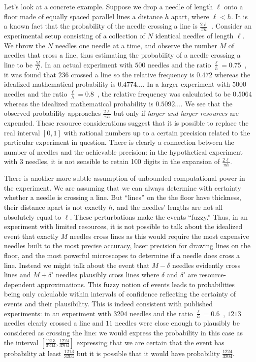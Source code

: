 \documentclass{article}
\theoremstyle{remark}
\begin{document}
Let's look at a concrete example. Suppose we drop a needle of length
$\ell$ onto a floor made of equally spaced parallel lines a distance
$h$ apart, where $\ell<h$. It is a known fact that the probability of
the needle crossing a line is
$\frac{2\ell}{\pi
  h}$~\cite{Buffon1777,DeMorgan1872,Hall1873,Uspensky1937}.
Consider an experimental setup consisting of a collection of $N$
identical needles of length $\ell$. We throw the $N$ needles one
needle at a time, and observe the number $M$ of needles that cross a
line, thus estimating the probability of a needle crossing a line to
be $\frac{M}{N}$. In an actual experiment with $500$ needles and the
ratio $\frac{\ell}{h}=0.75$~\cite{Hall1873}, it was found that $236$
crossed a line so the relative frequency is $0.472$ whereas the
idealized mathematical probability is $0.4774\ldots$.  In a larger
experiment with $5000$ needles and the ratio
$\frac{\ell}{h}=0.8$~\cite{Uspensky1937}, the relative frequency was
calculated to be $0.5064$ whereas the idealized mathematical
probability is $0.5092\ldots$. We see that the observed probability
approaches $\frac{2\ell}{\pi h}$ but only if \emph{larger and larger
  resources} are expended. These resource considerations suggest that
it is possible to replace the real interval $[0,1]$ with rational
numbers up to a certain precision related to the particular experiment
in question. There is clearly a connection between the number of
needles and the achievable precision: in the hypothetical experiment
with 3 needles, it is not sensible to retain 100 digits in the
expansion of $\frac{2\ell}{\pi h}$.

There is another more subtle assumption of unbounded computational
power in the experiment. We are assuming that we can always determine
with certainty whether a needle is crossing a line. But ``lines'' on
the the floor have thickness, their distance apart is not exactly $h$,
and the needles' lengths are not all absolutely equal to $\ell$.
These perturbations make the events ``fuzzy.'' Thus, in an experiment
with limited resources, it is not possible to talk about the idealized
event that exactly $M$ needles cross lines as this would require the
most expensive needles built to the most precise accuracy, laser
precision for drawing lines on the floor, and the most powerful
microscopes to determine if a needle does cross a line. Instead we
might talk about the event that $M-\delta$ needles evidently cross
lines and $M+\delta'$ needles plausibly cross lines where $\delta$ and
$\delta'$ are resource-dependent approximations. This fuzzy notion of
events leads to probabilities being only calculable within intervals
of confidence reflecting the certainty of events and their
plausibility. This is indeed consistent with published experiments: in
an experiment with $3204$ needles and the ratio
$\frac{\ell}{h}=0.6$~\cite{DeMorgan1872}, $1213$ needles clearly
crossed a line and $11$ needles were close enough to plausibly be
considered as crossing the line: we would express the probability in
this case as the interval
$\left[\frac{1213}{3204},\frac{1224}{3204}\right]$ expressing that we
are certain that the event has probability at least
$\frac{1213}{3204}$ but it is possible that it would have probability
$\frac{1224}{3204}$.
\end{document}
